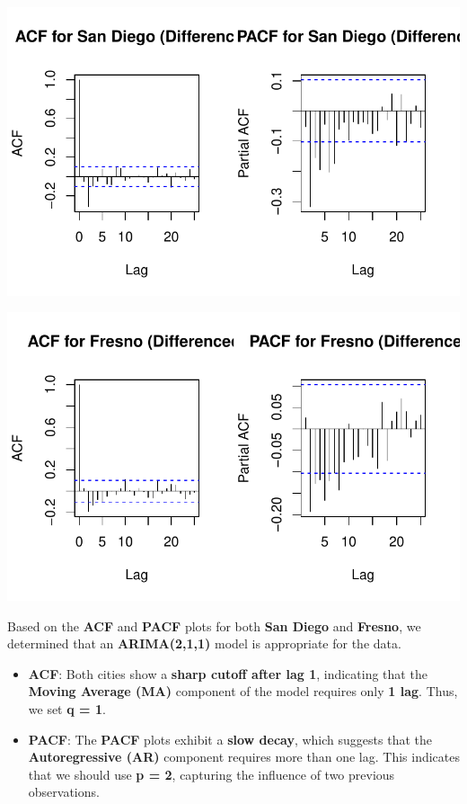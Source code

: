 \documentclass[
  11pt,
]{article}
\begin{document}
\includegraphics{project_files/figure-pdf/unnamed-chunk-83-1.pdf}

\includegraphics{project_files/figure-pdf/unnamed-chunk-84-1.pdf}

Based on the \textbf{ACF} and \textbf{PACF} plots for both \textbf{San
Diego} and \textbf{Fresno}, we determined that an \textbf{ARIMA(2,1,1)}
model is appropriate for the data.

\begin{itemize}
\item
  \textbf{ACF}: Both cities show a \textbf{sharp cutoff after lag 1},
  indicating that the \textbf{Moving Average (MA)} component of the
  model requires only \textbf{1 lag}. Thus, we set \textbf{q = 1}.
\item
  \textbf{PACF}: The \textbf{PACF} plots exhibit a \textbf{slow decay},
  which suggests that the \textbf{Autoregressive (AR)} component
  requires more than one lag. This indicates that we should use
  \textbf{p = 2}, capturing the influence of two previous observations.
\end{itemize}
\end{document}
